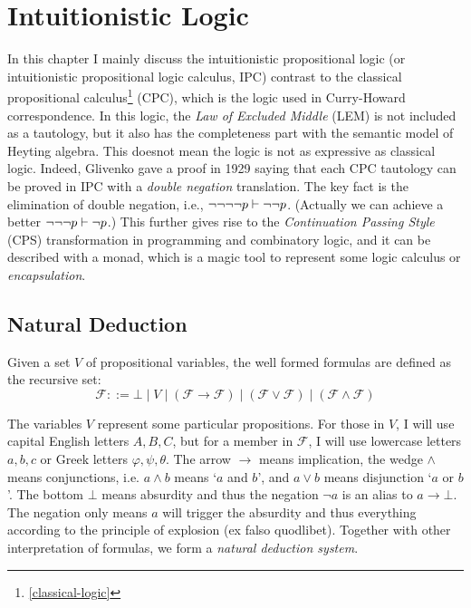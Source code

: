 \chapter{Intuitionistic Logic}
\label{intuitionistic-logic}

In this chapter I mainly discuss the intuitionistic propositional logic
(or intuitionistic propositional logic calculus, IPC) contrast to the
classical propositional calculus\footnote{\autoref{classical-logic}} 
(CPC), which is the logic used
in Curry-Howard correspondence. In this logic, the {\it Law of Excluded
Middle} (LEM) is not included as a tautology, but it also has the 
completeness part with the semantic model of Heyting algebra. 
This doesnot mean the logic is not as expressive as classical logic.
Indeed, Glivenko gave a proof in 1929 \cite{glivenko1929quelques} saying
that each CPC tautology can be proved in IPC with a {\it double negation}
translation. The key fact is the elimination of double negation, i.e.,
$\neg\neg\neg\neg p\vdash \neg\neg p$. (Actually we can achieve a better
$\neg\neg\neg p\vdash\neg p$.) This further gives rise to the {\it
Continuation Passing Style} (CPS) transformation in programming and 
combinatory logic, and it can be described with a monad, which is a
magic tool to represent some logic calculus or {\it encapsulation}.

\section{Natural Deduction}
\newcommand{\formula}{\mathscr{F}}

Given a set $V$ of propositional variables, the well formed
formulas are defined as the recursive set:
$$
    \formula ::= \bot 
        \mid V 
        \mid (\formula \to \formula) 
        \mid (\formula \vee \formula)
        \mid (\formula \wedge \formula)
$$

The variables $V$ represent some particular propositions. For those in
$V$, I will use capital English letters $A,B,C$, but for a member in 
$\formula$, I will use lowercase letters $a,b,c$ or Greek letters 
$\varphi,\psi,\theta$. The arrow $\to$ means implication, the wedge $\wedge$
means conjunctions, i.e. $a\wedge b$ means `$a$ and $b$', and
$a\vee b$ means disjunction `$a$ or $b$'. The bottom $\bot$ means 
absurdity and thus the negation $\neg a$ is an alias to $a\to\bot$.
The negation only means $a$ will trigger the absurdity and thus everything
according to the principle of explosion (ex falso quodlibet). Together
with other interpretation of formulas, we form a {\it natural deduction
system}. 

